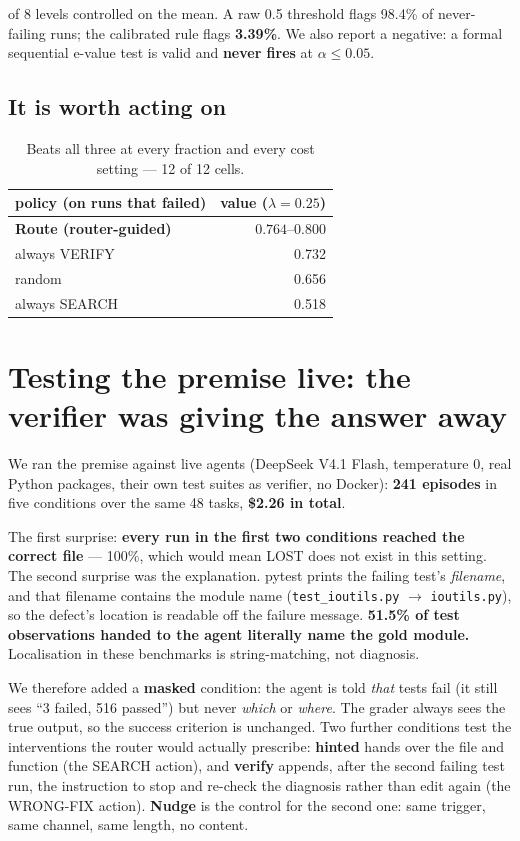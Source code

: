 \documentclass[10pt]{article}
\newcommand{\code}[1]{\texttt{\small #1}}
\begin{document}
 of 8 levels controlled on the mean. A raw 0.5 threshold flags 98.4\% of never-failing
runs; the calibrated rule flags \textbf{3.39\%}. We also report a negative: a formal sequential
e-value test is valid and \textbf{never fires} at $\alpha \le 0.05$.

\subsection{It is worth acting on}

\begin{table}[h]
\centering\small
\begin{tabular}{lr}
\toprule
policy (on runs that failed) & value ($\lambda = 0.25$) \\
\midrule
\textbf{Route (router-guided)} & $\mathbf{0.764}$--$\mathbf{0.800}$ \\
always VERIFY & 0.732 \\
random & 0.656 \\
always SEARCH & 0.518 \\
\bottomrule
\end{tabular}
\caption{Beats all three at every fraction and every cost setting --- 12 of 12 cells.}
\end{table}

\section{Testing the premise live: the verifier was giving the answer away}

We ran the premise against live agents (DeepSeek V4.1 Flash, temperature 0, real Python packages,
their own test suites as verifier, no Docker): \textbf{241 episodes} in five conditions over the same
48 tasks, \textbf{\$2.26 in total}.

The first surprise: \textbf{every run in the first two conditions reached the correct file} --- 100\%,
which would mean LOST does not exist in this setting. The second surprise was the explanation. pytest
prints the failing test's \emph{filename}, and that filename contains the module name
(\code{test\_ioutils.py} $\rightarrow$ \code{ioutils.py}), so the defect's location is readable off
the failure message. \textbf{51.5\% of test observations handed to the agent literally name the gold
module.} Localisation in these benchmarks is string-matching, not diagnosis.

We therefore added a \textbf{masked} condition: the agent is told \emph{that} tests fail (it still
sees ``3 failed, 516 passed'') but never \emph{which} or \emph{where}. The grader always sees the
true output, so the success criterion is unchanged. Two further conditions test the interventions
the router would actually prescribe: \textbf{hinted} hands over the file and function (the SEARCH
action), and \textbf{verify} appends, after the second failing test run, the instruction to stop and
re-check the diagnosis rather than edit again (the WRONG-FIX action). \textbf{Nudge} is the control
for the second one: same trigger, same channel, same length, no content.
\end{document}
